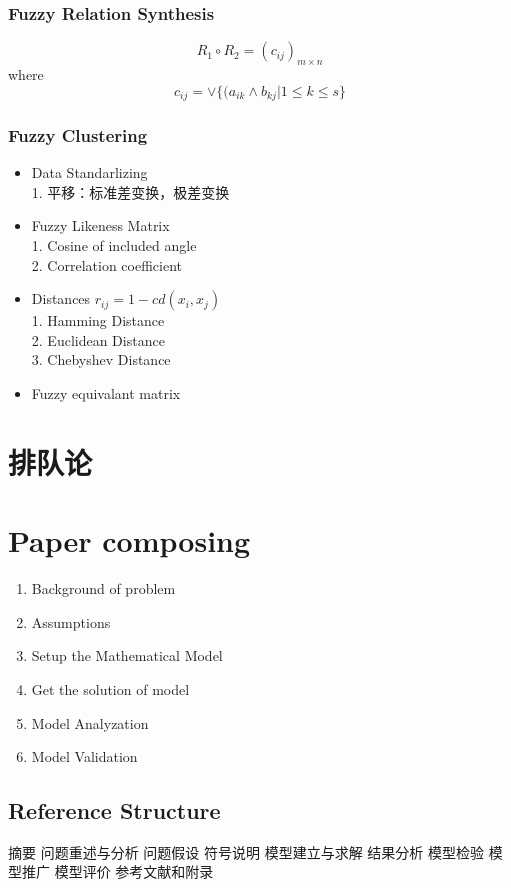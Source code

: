 \documentclass[12pt,a4paper]{article} \usepackage{kurier}
\begin{document}
\begin{CJK}{UTF8}{gkai}
\begin{multicols}{2}
		\subsubsection{Fuzzy Relation Synthesis}
			\[ R_1 \circ R_2 = (c_{ij})_{m\times n} \]
			where
			\[ c_{ij} = \vee \{ (a_{ik} \wedge b_{kj} | 1 \leq k \leq s \}\]
		\subsubsection{Fuzzy Clustering}
			\begin{itemize}
			\item Data Standarlizing\\
				1. 平移：标准差变换，极差变换
			\item Fuzzy Likeness Matrix\\
				1. Cosine of included angle\\
				2. Correlation coefficient\\
			\item Distances $r_{ij} = 1 - c d(x_i, x_j)$\\
				1. Hamming Distance\\
				2. Euclidean Distance\\
				3. Chebyshev Distance\\
			\item Fuzzy equivalant matrix
			\end{itemize}
\end{multicols}

\section{排队论}

\newpage
\appendix
\section{Paper composing}
\begin{multicols}{2}
	\begin{enumerate}
	\item Background of problem
	\item Assumptions
	\item Setup the Mathematical Model
	\item Get the solution of model
	\item Model Analyzation
	\item Model Validation
	\end{enumerate}
	\subsection{Reference Structure}
	摘要
	问题重述与分析
	问题假设
	符号说明
	模型建立与求解
	结果分析
	模型检验
	模型推广
	模型评价
	参考文献和附录
\end{multicols}


\end{CJK}
\end{document}
